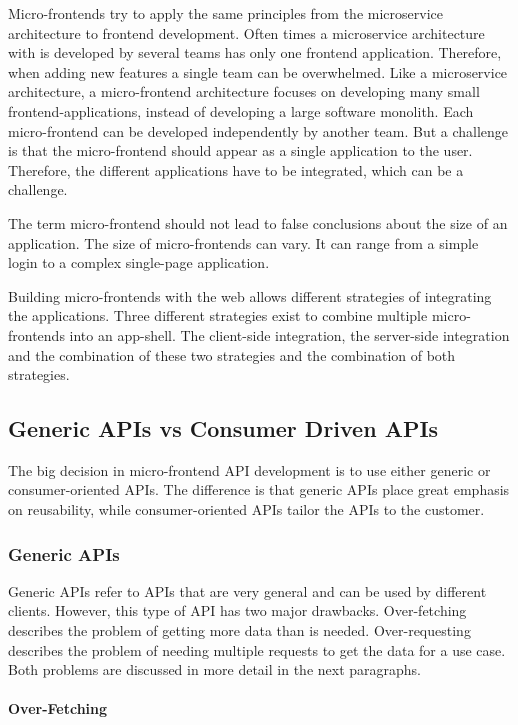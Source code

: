 Micro-frontends try to apply the same principles from the microservice architecture to frontend development. Often times a microservice architecture with is developed by several teams has only one frontend application. Therefore, when adding new features a single team can be overwhelmed. Like a microservice architecture, a micro-frontend architecture focuses on developing many small frontend-applications, instead of developing a large software monolith. Each micro-frontend can be developed independently by another team. But a challenge is that the micro-frontend should appear as a single application to the user. Therefore, the different applications have to be integrated, which can be a challenge.

The term micro-frontend should not lead to false conclusions about the size of an application. The size of micro-frontends can vary. It can range from a simple login to a complex single-page application.

Building micro-frontends with the web allows different strategies of integrating the applications. Three different strategies exist to combine multiple micro-frontends into an app-shell. The client-side integration, the server-side integration and the combination of these two strategies and the combination of both strategies.

\subsection{Generic APIs vs Consumer Driven APIs}

The big decision in micro-frontend API development is to use either generic or consumer-oriented APIs. The difference is that generic APIs place great emphasis on reusability, while consumer-oriented APIs tailor the APIs to the customer.

\subsubsection{Generic APIs}

Generic APIs refer to APIs that are very general and can be used by different clients. However, this type of API has two major drawbacks. Over-fetching describes the problem of getting more data than is needed. Over-requesting describes the problem of needing multiple requests to get the data for a use case. Both problems are discussed in more detail in the next paragraphs. \cite{misc:2019:leitner:backend-for-frontends}

\paragraph{Over-Fetching}

